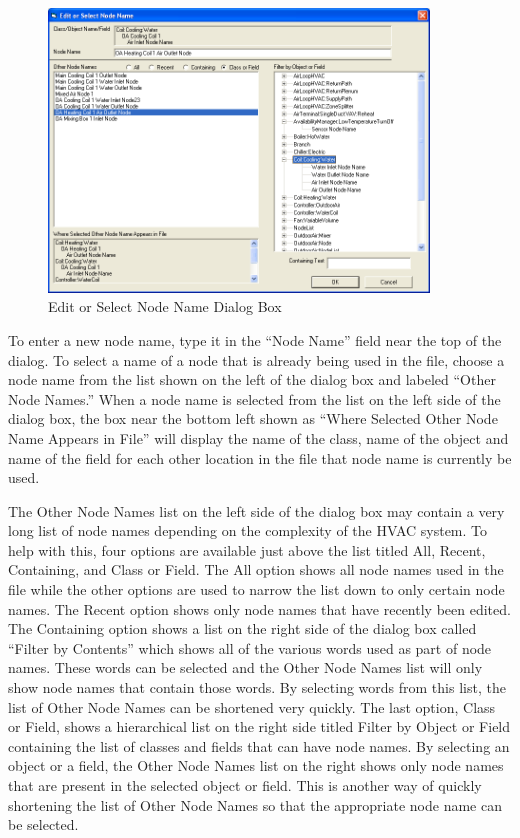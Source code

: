 \begin{figure}[hbtp] %
\centering
\includegraphics[width=0.9\textwidth, height=0.9\textheight, keepaspectratio=true]{media/image116.png}
\caption{Edit or Select Node Name Dialog Box \protect \label{fig:edit-or-select-node-name-dialog-box}}
\end{figure}

To enter a new node name, type it in the ``Node Name'' field near the top of the dialog. To select a name of a node that is already being used in the file, choose a node name from the list shown on the left of the dialog box and labeled ``Other Node Names.'' When a node name is selected from the list on the left side of the dialog box, the box near the bottom left shown as ``Where Selected Other Node Name Appears in File'' will display the name of the class, name of the object and name of the field for each other location in the file that node name is currently be used.

The Other Node Names list on the left side of the dialog box may contain a very long list of node names depending on the complexity of the HVAC system. To help with this, four options are available just above the list titled All, Recent, Containing, and Class or Field. The All option shows all node names used in the file while the other options are used to narrow the list down to only certain node names. The Recent option shows only node names that have recently been edited. The Containing option shows a list on the right side of the dialog box called ``Filter by Contents'' which shows all of the various words used as part of node names. These words can be selected and the Other Node Names list will only show node names that contain those words. By selecting words from this list, the list of Other Node Names can be shortened very quickly. The last option, Class or Field, shows a hierarchical list on the right side titled Filter by Object or Field containing the list of classes and fields that can have node names. By selecting an object or a field, the Other Node Names list on the right shows only node names that are present in the selected object or field. This is another way of quickly shortening the list of Other Node Names so that the appropriate node name can be selected.

